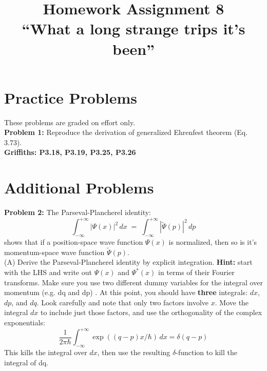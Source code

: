 \documentclass[12pt]{article}
\begin{document}
\newcommand{\ihbar}{\ensuremath{i \hbar}}
\newcommand{\dPsidt}{\ensuremath{ \frac{\partial \Psi}{\partial t} }}
\newcommand{\dPsidx}{\ensuremath{ \frac{\partial \Psi}{\partial x} }}
\newcommand{\ddPsidx}{\ensuremath{ \frac{\partial^2 \Psi}{\partial x^2} }}
\newcommand{\dPssdt}{\ensuremath{ \frac{\partial \Psi^*}{\partial t} }}
\newcommand{\dPssdx}{\ensuremath{ \frac{\partial \Psi^*}{\partial x} }}
\newcommand{\ddPssdx}{\ensuremath{ \frac{\partial^2 \Psi^*}{\partial x^2} }}

\newcommand{\dphidt}{\ensuremath{ \frac{d \phi}{dt} }}
\newcommand{\dpsidx}{\ensuremath{ \frac{d \psi}{dx} }}
\newcommand{\ddpsidx}{\ensuremath{ \frac{d^2 \psi}{dx^2} }}


\date{\vspace{-5ex}}

\title{Homework Assignment 8 \\ ``What a long strange trips it's been''}

\maketitle

\section*{Practice Problems}

These problems are graded on effort only.\\

\noindent
{\bf Problem 1:} Reproduce the derivation of generalized Ehrenfest theorem (Eq. 3.73).\\[5pt]

\noindent
{\bf Griffiths: P3.18, P3.19, P3.25, P3.26} \\
  
\section*{Additional Problems}

\noindent
{\bf Problem 2:} The Parseval-Plancherel identity:
$$\int_{-\infty}^{+\infty} |\Psi(x)|^2 \, dx \; = \; \int_{-\infty}^{+\infty} |\widetilde{\Psi}(p)|^2 \, dp$$
shows that if a position-space wave function $\Psi(x)$ is normalized, then so is it's momentum-space wave function $\widetilde{\Psi}(p)$.\\[5pt]

\noindent
(A) Derive the Parseval-Plancherel identity by explicit integration.  {\bf Hint:  } start with the LHS and write out $\Psi(x)$ and $\Psi^*(x)$ in terms of their Fourier transforms.  Make sure you use two different dummy variables for the integral over momentum (e.g. dq and dp) .  At this point, you should have {\bf three} integrals: $dx$,$dp$, and $dq$.  Look carefully and note that only two factors involve $x$.  Move the integral $dx$ to include just those factors, and use the orthogonality of the complex exponentials:
$$\frac{1}{2\pi\hbar}\int_{-\infty}^{+\infty} \exp((q-p)x/\hbar) \, dx = \delta(q-p)$$
This kills the integral over $dx$, then use the resulting $\delta$-function to kill the integral of dq.\\[8pt]
\end{document}
